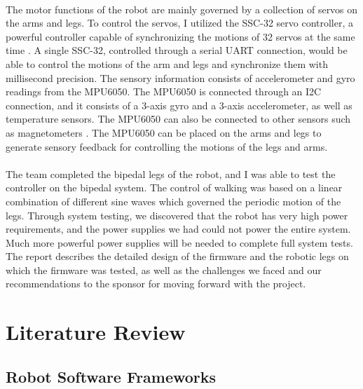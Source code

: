 \documentclass[titlepage,letterpaper,12pt]{article}
\begin{document}
\paragraph{}The motor functions of the robot are mainly governed by a collection
of servos on the arms and legs. To control the servos, I utilized the SSC-32
servo controller, a powerful controller capable of synchronizing the motions of
32 servos at the same time \cite{sscdata}. A single SSC-32, controlled through a
serial UART connection, would be able to control the motions of the arm and legs
and synchronize them with millisecond precision.  The sensory information
consists of accelerometer and gyro readings from the MPU6050. The
MPU6050 is connected through an I2C connection, and it consists of a 3-axis gyro
and a 3-axis accelerometer, as well as temperature sensors. The MPU6050 can also
be connected to other sensors such as magnetometers \cite{mpu6050data}. The
MPU6050 can be placed on the arms and legs to generate sensory feedback for
controlling the motions of the legs and arms.

\paragraph{}The team completed the bipedal legs of the robot, and I was able to
test the controller on the bipedal system. The control of walking was based on a
linear combination of different sine waves which governed the periodic motion of
the legs. Through system testing, we discovered that the robot has very high
power requirements, and the power supplies we had could not power the entire
system.  Much more powerful power supplies will be needed to complete full
system tests.  The report describes the detailed design of the firmware and the
robotic legs on which the firmware was tested, as well as the challenges we
faced and our recommendations to the sponsor for moving forward with the
project.

\section{Literature Review}
\subsection{Robot Software Frameworks}
\end{document}
